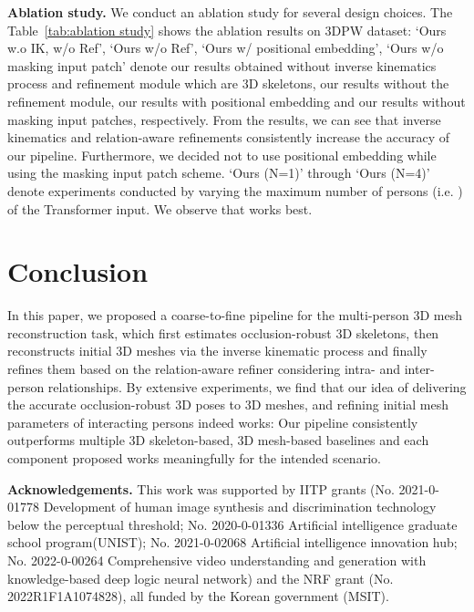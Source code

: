 \documentclass[runningheads]{llncs}
\begin{document}
\noindent \textbf{Ablation study.} We conduct an ablation study for several design choices. The Table~\ref{tab:ablation study} shows the ablation results on 3DPW dataset: `Ours w.o IK, w/o Ref', `Ours w/o Ref', `Ours w/ positional embedding', `Ours w/o masking input patch' denote our results obtained without inverse kinematics process and refinement module which are 3D skeletons, our results without the refinement module, our results with positional embedding and our results without masking input patches, respectively. From the results, we can see that inverse kinematics and relation-aware refinements consistently increase the accuracy of our pipeline. Furthermore, we decided not to use positional embedding while using the masking input patch scheme. `Ours (N=1)' through `Ours (N=4)' denote experiments conducted by varying the maximum number of persons (i.e. ) of the Transformer input. We observe that  works best.

\section{Conclusion}
In this paper, we proposed a coarse-to-fine pipeline for the multi-person 3D mesh reconstruction task, which first estimates occlusion-robust 3D skeletons, then reconstructs initial 3D meshes via the inverse kinematic process and finally refines them based on the relation-aware refiner considering intra- and inter-person relationships. By extensive experiments, we find that our idea of delivering the accurate occlusion-robust 3D poses to 3D meshes, and refining initial mesh parameters of interacting persons indeed works: Our pipeline consistently outperforms multiple 3D skeleton-based, 3D mesh-based baselines and each component proposed works meaningfully for the intended scenario. 

\noindent \textbf{Acknowledgements.} This work was supported by IITP grants (No. 2021-0-01778 Development of human image synthesis and discrimination technology below the perceptual threshold; No. 2020-0-01336 Artificial intelligence graduate school program(UNIST); No. 2021-0-02068 Artificial intelligence innovation hub; No. 2022-0-00264 Comprehensive video understanding and generation with knowledge-based deep logic neural network) and the NRF grant (No. 2022R1F1A1074828), all funded by the Korean government (MSIT). 

\clearpage


\end{document}
